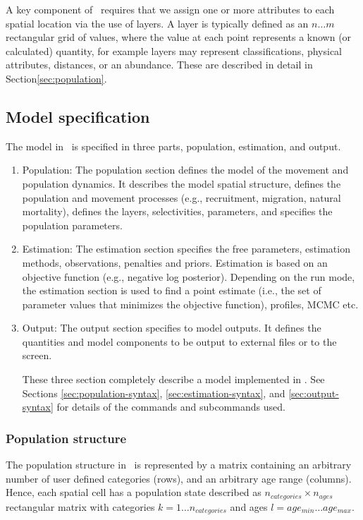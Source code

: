 A key component of \SPM\ requires that we assign one or more attributes to each spatial location via the use of layers. A layer is typically defined as an $n \ldots m$ rectangular grid of values, where the value at each point represents a known (or calculated) quantity, for example layers may represent classifications, physical attributes, distances, or an abundance. These are described in detail in Section\ref{sec:population}.

\subsection{Model specification}

The model in \SPM\ is specified in three parts, population, estimation, and output. 

\begin{enumerate}
\item Population: The population section defines the model of the movement and population dynamics. It describes the model spatial structure, defines the population and movement processes (e.g., recruitment, migration, natural mortality), defines the layers, selectivities, parameters, and specifies the population parameters.

\item Estimation: The estimation section specifies the free parameters, estimation methods, observations, penalties and priors. Estimation is based on an objective function (e.g., negative log posterior). Depending on the run mode, the estimation section is used to find a point estimate (i.e., the set of parameter values that minimizes the objective function), profiles, MCMC etc.

\item Output: The output section specifies to model outputs. It defines the quantities and model components to be output to external files or to the screen.

These three section completely describe a model implemented in \SPM. See Sections \ref{sec:population-syntax}, \ref{sec:estimation-syntax}, and \ref{sec:output-syntax} for details of the commands and subcommands used.
\end{enumerate}

\subsubsection{Population structure}

The population structure in \SPM\ is represented by a matrix containing an arbitrary number of user defined categories (rows), and an arbitrary age range (columns). Hence, each spatial cell has a population state described as $n_{categories} \times n_{ages}$ rectangular matrix with categories $k=1 \ldots n_{categories}$ and ages $l=age_{min} \ldots age_{max}$. 

